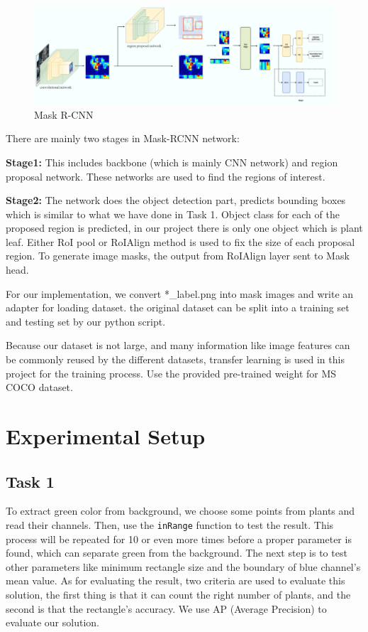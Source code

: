 \documentclass[conference]{IEEEtran}
\begin{document}
\begin{figure}[h!]
\centering
\includegraphics[width=\linewidth]{img/maskrcnn.png}
\caption{Mask R-CNN}
\label{fig_mask-rcnn}
\end{figure}

There are mainly two stages in Mask-RCNN network:

\textbf{Stage1:} This includes backbone (which is mainly CNN network) and region proposal network. These networks are used to find the regions of interest.

\textbf{Stage2:} The network does the object detection part, predicts bounding boxes which is similar to what we have done in Task 1.
Object class for each of the proposed region is predicted, in our project there is only one object which is plant leaf. 
Either RoI pool or RoIAlign method is used to fix the size of each proposal region.
To generate image masks, the output from RoIAlign layer sent to Mask head.

For our implementation, we convert *\_label.png into mask images and write an adapter for loading dataset.
the original dataset can be split into a training set and testing set by our python script.

Because our dataset is not large, and many information like image features can be commonly reused by the different datasets, 
transfer learning \cite{pan2009survey} is used in this project for the training process.
Use the provided pre-trained weight for MS COCO dataset\cite{Lin_2014}.

\section{Experimental Setup}
\subsection{Task 1}

To extract green color from background, we choose some points from plants and read their channels. Then, use the \verb|inRange| function to test the result. This process will be repeated for 10 or even more times before a proper parameter is found, which can separate green from the background.  The next step is to test other parameters like minimum rectangle size and the boundary of blue channel’s mean value.
As for evaluating the result, two criteria are used to evaluate this solution, the first thing is that it can count the right number of plants, and the second is that the rectangle’s accuracy. We use AP (Average Precision) to evaluate our solution.
\end{document}
